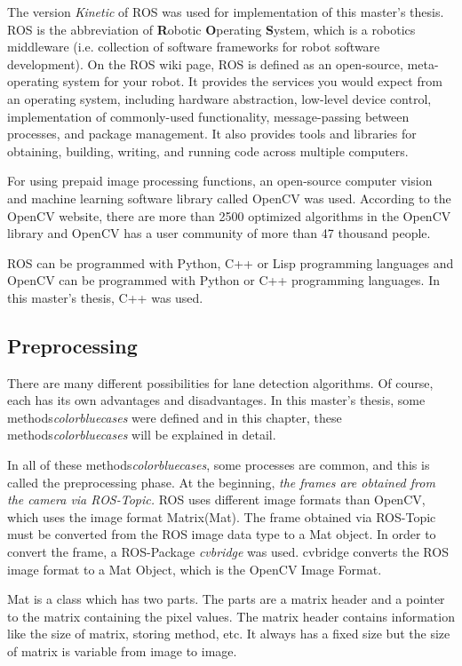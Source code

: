 The version \textit{Kinetic} of ROS was used for implementation of this master's thesis. ROS is the abbreviation of \textbf{R}obotic \textbf{O}perating \textbf{S}ystem, which is a robotics middleware (i.e. collection of software frameworks for robot software development). On the ROS wiki page\cite{ROS}, ROS is defined as an open-source, meta-operating system for your robot. It provides the services you would expect from an operating system, including hardware abstraction, low-level device control, implementation of commonly-used functionality, message-passing between processes, and package management. It also provides tools and libraries for obtaining, building, writing, and running code across multiple computers.

For using prepaid image processing functions, an open-source computer vision and machine learning software library called OpenCV was used. According to the OpenCV website\cite{OpenCV}, there are more than 2500 optimized algorithms in the OpenCV library and OpenCV has a user community of more than 47 thousand people.

ROS can be programmed with Python, C++ or Lisp programming languages and OpenCV can be programmed with Python or C++ programming languages. In this master's thesis, C++ was used.

%
\subsection{Preprocessing}\label{sec:Preprocessing}

There are many different possibilities for lane detection algorithms. Of course, each has its own advantages and disadvantages. In this master's thesis, some methods\emph{color{blue}cases} were defined and in this chapter, these methods\emph{color{blue}cases} will be explained in detail.

In all of these methods\emph{color{blue}cases}, some processes are common, and this is called the preprocessing phase. At the beginning,\emph{\color{blue} the frames are obtained from the camera via ROS-Topic.} ROS uses different image formats than OpenCV, which uses the image format Matrix(Mat). The frame obtained via ROS-Topic must be converted from the ROS image data type to a Mat object. In order to convert the frame, a ROS-Package \textit{cvbridge}\cite{cv_bridge} was used. cvbridge converts the ROS image format to a Mat Object, which is the OpenCV Image Format. 

Mat is a class which has two parts. The parts are a matrix header and a pointer to the matrix containing the pixel values. The matrix header contains information like the size of matrix, storing method, etc. It always has a fixed size but the size of matrix is variable from image to image.

